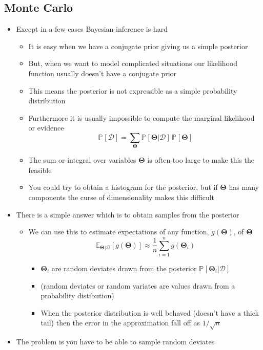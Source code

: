 \documentclass[11pt]{article}
\newcommand{\av}[2][]{\mathbb{E}_{#1\!}\left[ #2 \right]}
\newcommand{\Prob}[2][]{\mathbb{P}_{#1\!}\left[ #2 \right]}
\begin{document}
\subsection{Monte Carlo}
\label{sec:org74a24eb}
\begin{itemize}
\item Except in a few cases Bayesian inference is hard
\begin{itemize}
\item It is easy when we have a conjugate prior giving us a simple posterior
\item But, when we want to model complicated situations our
likelihood function usually doesn't have a conjugate prior
\item This means the posterior is not expressible as a simple
probability distribution
\item Furthermore it is usually impossible to compute the marginal
likelihood or evidence
$$ \Prob{\mathcal{D}} = \sum_{\bm{\Theta}}
       \Prob{\bm{\Theta}|\mathcal{D}} \, \Prob{\bm{\Theta}} $$
\item The sum or integral over variables \(\bm{\Theta}\) is often too
large to make this the feasible
\item You could try to obtain a histogram for the posterior, but if
\(\bm{\Theta}\) has many components the curse of dimensionality
makes this difficult
\end{itemize}
\item There is a simple answer which is to obtain samples from the posterior
\begin{itemize}
\item We can use this to estimate expectations of any function,
\(g(\bm{\Theta})\), of \(\bm{\Theta}\)
$$ \av[\bm{\Theta}|\mathcal{D}]{g(\bm{\Theta})} \approx
       \frac{1}{n} \sum_{i=1}^{n}   g(\bm{\Theta}_{i}) $$
\begin{itemize}
\item \(\bm{\Theta}_{i}\) are random deviates drawn from
the posterior \(\Prob{\bm{\Theta}_{i}|\mathcal{D}}\)
\item (random deviates or random variates are values drawn from a
probability distibution)
\item When the posterior distribution is well behaved (doesn't have a
thick tail) then the error in the approximation fall off as \(1/\sqrt{n}\)
\end{itemize}
\end{itemize}
\item The problem is you have to be able to sample random deviates

\end{itemize}
\end{document}
